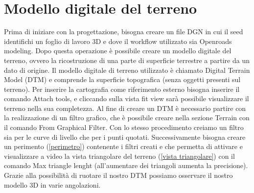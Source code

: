 \chapter{Modello digitale del terreno}

Prima di iniziare con la progettazione, bisogna creare un file DGN in cui il seed identifichi un foglio di lavoro 3D e dove il workflow utilizzato sia Openroads modeling. Dopo questa operazione è possibile creare un modello digitale del terreno, ovvero la ricostruzione di una parte di superficie terrestre a partire da un dato di origine.  Il modello digitale di terreno utilizzato è chiamato Digital Terrain Model (DTM) e comprende la superficie topografica (senza oggetti presenti sul terreno). Per inserire la cartografia come riferimento esterno bisogna inserire il comando Attach tools, e cliccando sulla vista fit view sarà possibile visualizzare il terreno nella sua completezza. Al fine di creare un DTM è necessario partire con la realizzazione di un filtro grafico, che è possibile creare nella sezione Terrain con il comando From Graphical Filter. Con lo stesso procedimento creiamo un filtro sia per le curve di livello che per i punti quotati. Successivamente bisogna creare un perimento (\ref{perimetro}) contenente i filtri creati e che permetta di attivare e visualizzare a video la vista triangolare del terreno (\ref{vista triangolare}) con il comando Max triangle lenght (all’aumentare dei triangoli aumenta la precisione). Grazie alla possibilità di ruotare il nostro DTM possiamo osservare il nostro modello 3D in varie angolazioni.

